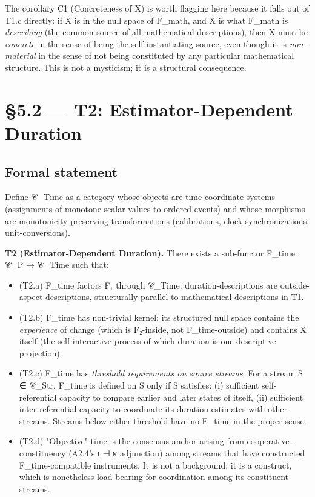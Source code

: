 \documentclass[11pt, openany]{book}
\newcommand{\sectionbreak}{\clearpage}
\begin{document}
The corollary C1 (Concreteness of X) is worth flagging here because it falls out of T1.c directly: if X is in the null space of F\_\allowbreak{}math, and X is what F\_\allowbreak{}math is \textit{describing} (the common source of all mathematical descriptions), then X must be \textit{concrete} in the sense of being the self-instantiating source, even though it is \textit{non-material} in the sense of not being constituted by any particular mathematical structure. This is not a mysticism; it is a structural consequence.

\sectionbreak

\section{§5.2 --- T2: Estimator-Dependent Duration}

\subsection{Formal statement}

Define 𝒞\_\allowbreak{}Time as a category whose objects are time-coordinate systems (assignments of monotone scalar values to ordered events) and whose morphisms are monotonicity-preserving transformations (calibrations, clock-synchronizations, unit-conversions).

\textbf{T2 (Estimator-Dependent Duration).} There exists a sub-functor F\_\allowbreak{}time : 𝒞\_\allowbreak{}P → 𝒞\_\allowbreak{}Time such that:

\begin{itemize}
\item (T2.a) F\_\allowbreak{}time factors F₁ through 𝒞\_\allowbreak{}Time: duration-descriptions are outside-aspect descriptions, structurally parallel to mathematical descriptions in T1.
\item (T2.b) F\_\allowbreak{}time has non-trivial kernel: its structured null space contains the \textit{experience} of change (which is F₂-inside, not F\_\allowbreak{}time-outside) and contains X itself (the self-interactive process of which duration is one descriptive projection).
\item (T2.c) F\_\allowbreak{}time has \textit{threshold requirements on source streams}. For a stream S ∈ 𝒞\_\allowbreak{}Str, F\_\allowbreak{}time is defined on S only if S satisfies: (i) sufficient self-referential capacity to compare earlier and later states of itself, (ii) sufficient inter-referential capacity to coordinate its duration-estimates with other streams. Streams below either threshold have no F\_\allowbreak{}time in the proper sense.
\item (T2.d) "Objective" time is the consensus-anchor arising from cooperative-constituency (A2.4's ι ⊣ κ adjunction) among streams that have constructed F\_\allowbreak{}time-compatible instruments. It is not a background; it is a construct, which is nonetheless load-bearing for coordination among its constituent streams.
\end{itemize}
\end{document}
